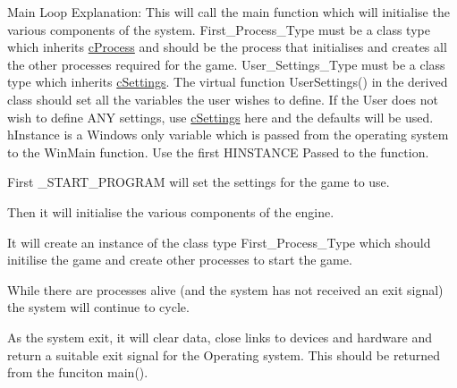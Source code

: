 Main Loop Explanation: This will call the main function which will initialise the various components of the system. First\_\-Process\_\-Type must be a class type which inherits \hyperlink{classc_process}{cProcess} and should be the process that initialises and creates all the other processes required for the game. User\_\-Settings\_\-Type must be a class type which inherits \hyperlink{classc_settings}{cSettings}. The virtual function UserSettings() in the derived class should set all the variables the user wishes to define. If the User does not wish to define ANY settings, use \hyperlink{classc_settings}{cSettings} here and the defaults will be used. hInstance is a Windows only variable which is passed from the operating system to the WinMain function. Use the first HINSTANCE Passed to the function.\par
 First \_\-START\_\-PROGRAM will set the settings for the game to use.\par
 Then it will initialise the various components of the engine.\par
 It will create an instance of the class type First\_\-Process\_\-Type which should initilise the game and create other processes to start the game.\par
 While there are processes alive (and the system has not received an exit signal) the system will continue to cycle.\par
 As the system exit, it will clear data, close links to devices and hardware and return a suitable exit signal for the Operating system. This should be returned from the funciton main().\par
 